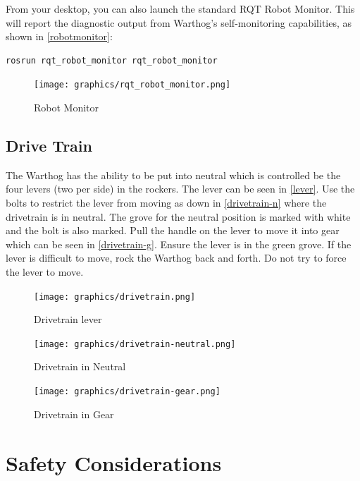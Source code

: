 \documentclass[]{clearpath-latex/clearpath-manual}
\begin{document}
\pagebreak[4]

From your desktop, you can also launch the standard RQT Robot Monitor. This will report the diagnostic output from Warthog's self-monitoring capabilities, as shown in \autoref{robotmonitor}:

\begin{lstlisting}
rosrun rqt_robot_monitor rqt_robot_monitor
\end{lstlisting}

\begin{figure}[!htb]
  \centering
  \texttt{[image: graphics/rqt\_robot\_monitor.png]}
  \caption{Robot Monitor}
  \label{robotmonitor}
\end{figure}


\subsection{Drive Train}

The Warthog has the ability to be put into neutral which is controlled be the four levers (two per side) in the rockers.  The lever can be seen in \autoref{lever}.  Use the bolts to restrict the lever from moving as down in \autoref{drivetrain-n} where the drivetrain is in neutral.  The grove for the neutral position is marked with white and the bolt is also marked.  Pull the handle on the lever to move it into gear which can be seen in \autoref{drivetrain-g}.  Ensure the lever is in the green grove.  If the lever is difficult to move, rock the Warthog back and forth.  Do not try to force the lever to move.

\begin{figure}[!htb]
  \centering
  \texttt{[image: graphics/drivetrain.png]}
  \caption{Drivetrain lever}
  \label{lever}
\end{figure}


\begin{figure}[!htb]
  \centering
  \texttt{[image: graphics/drivetrain-neutral.png]}
  \caption{Drivetrain in Neutral}
  \label{drivetrain-n}
\end{figure}


\begin{figure}[!t]
  \centering
  \texttt{[image: graphics/drivetrain-gear.png]}
  \caption{Drivetrain in Gear}
  \label{drivetrain-g}
\end{figure}


\section{Safety Considerations}
\end{document}
